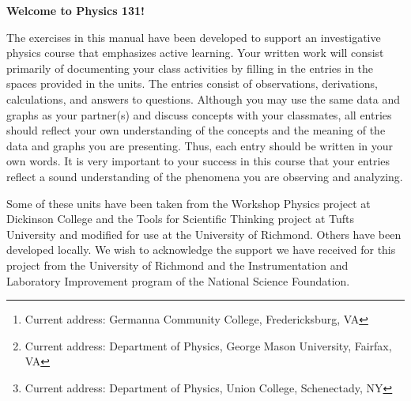 \author{Matthew G. Belk, Emory F. Bunn, 
Mirela Fetea\footnote{Current address: Germanna Community College, Fredericksburg, VA}, 
Gerard P. Gilfoyle, Henry Nebel, \\
Philip D. Rubin\footnote{Current address: Department of Physics, George Mason University, Fairfax, VA}, 
Jack Singal, Matthew L. Trawick, 
and Michael F. Vineyard\footnote{Current address: Department of Physics, Union College, Schenectady, NY}\\[4pt]
Department of Physics, University of Richmond, VA \\[4pt]
}

\maketitle

\vspace{0.8 in}


\begin{center}
\large{\textbf{Welcome to Physics 131!}}
\end{center}

The exercises in this manual have been developed to support an investigative
physics course that emphasizes active learning. 
Your written work will consist primarily of documenting
your class activities by filling in the entries in the spaces provided
in the units. The entries consist of observations, derivations, calculations,
and answers to questions. Although you may use the same data and graphs
as your partner(s) and discuss concepts with your classmates, all
entries should reflect your own understanding of the concepts and
the meaning of the data and graphs you are presenting. Thus, each
entry should be written in your own words. It is very important
to your success in this course that your entries reflect a sound understanding
of the phenomena you are observing and analyzing. 

Some of these units
have been taken from the Workshop Physics project at Dickinson College
and the Tools for Scientific Thinking project at Tufts University
and modified for use at the University of Richmond. Others have been
developed locally. 
We wish to acknowledge the support we have received for this project
from the University of Richmond and the Instrumentation and Laboratory
Improvement program of the National Science Foundation. 


